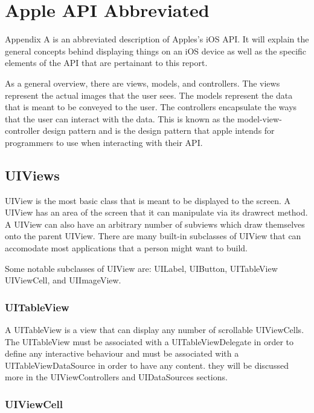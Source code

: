 \documentclass[se]{uw-wkrpt}
\begin{document}
\appendix

\section{Apple API Abbreviated}

Appendix A is an abbreviated description of Apples's iOS API. It
will explain the general concepts behind displaying things on
an iOS device as well as the specific elements of the API that
are pertainant to this report.

As a general overview, there are views, models, and controllers.
The views represent the actual images that the user sees. The models
represent the data that is meant to be conveyed to the user. The
controllers encapsulate the ways that the user can interact with
the data. This is known as the model-view-controller design pattern
and is the design pattern that apple intends for programmers to use
when interacting with their API.

\subsection{UIViews}

UIView is the most basic class that is meant to be displayed to
the screen. A UIView has an area of the screen that it can manipulate
via its drawrect method. A UIView can also have an arbitrary number of 
subviews which draw themselves onto the parent UIView. There are 
many built-in subclasses of UIView that can accomodate most 
applications that a person might want to build.

Some notable subclasses of UIView are: UILabel, UIButton, UITableView
UIViewCell, and UIImageView.

\subsubsection{UITableView}

A UITableView is a view that can display any number of scrollable 
UIViewCells. The UITableView must be associated with a UITableViewDelegate
in order to define any interactive behaviour and must be associated
with a UITableViewDataSource in order to have any content. they will be
discussed more in the UIViewControllers and UIDataSources sections.

\subsubsection{UIViewCell}
\end{document}
